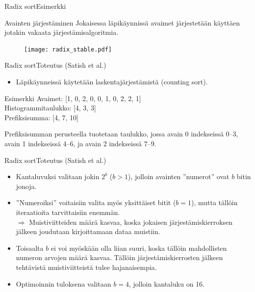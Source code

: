 \documentclass{beamer}
\begin{document}
\begin{frame}{Radix sort}{Esimerkki}
\begin{exampleblock}{Avainten järjestäminen}
Jokaisessa läpikäynnissä avaimet järjestetään käyttäen jotakin vakaata järjestämisalgoritmia.
\begin{figure}
    \texttt{[image: radix\_stable.pdf]}
\end{figure}
\end{exampleblock}
\end{frame}

\begin{frame}{Radix sort}{Toteutus (Satish et al.)}
    \begin{itemize}
      \item
        Läpikäynneissä käytetään laskentajärjestämistä (counting sort).
    \end{itemize}
\begin{exampleblock}{Esimerkki}
Avaimet: [1, 0, 2, 0, 0, 1, 0, 2, 2, 1] \\
Histogrammitaulukko: [4, 3, 3] \\
Prefiksisumma: [4, 7, 10] \\
\end{exampleblock}
Prefiksisumman perusteella tuotetaan taulukko, jossa avain 0 indekseissä 0--3, avain 1 indekseissä 4--6, ja avain 2 indekseissä 7--9.
\end{frame}

\begin{frame}{Radix sort}{Toteutus (Satish et al.)}
\begin{itemize}
    \item
      Kantaluvuksi valitaan jokin $2^b$ ($b > 1$), jolloin avainten ''numerot'' ovat $b$ bitin jonoja.
    \item
      ''Numeroiksi'' voitaisiin valita myös yksittäiset bitit ($b = 1$), mutta tällöin iteraatioita tarvittaisiin enemmän. \\ $\Rightarrow$ Muistiviitteiden määrä kasvaa, koska jokaisen järjestämiskierroksen jälkeen joudutaan kirjoittamaan dataa muistiin.
    \item
      Toisaalta $b$ ei voi myöskään olla liian suuri, koska tällöin mahdollisten numeron arvojen määrä kasvaa. Tällöin järjestämiskierrosten jälkeen tehtävistä muistiviitteistä tulee hajanaisempia.
    \item
      Optimoinnin tuloksena valitaan $b = 4$, jolloin kantaluku on 16.
\end{itemize}
\end{frame}
\end{document}
